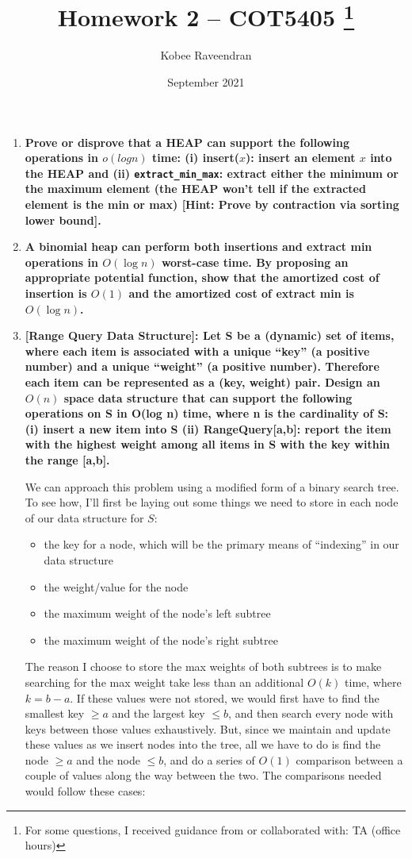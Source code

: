 \documentclass[12pt]{article}
\title{Homework 2 -- COT5405
    \thanks{For some questions, I received guidance from or collaborated with: TA (office hours)}
}
\author{Kobee Raveendran}
\date{September 2021}
\begin{document}
\maketitle

\begin{enumerate}
    \item \textbf{Prove or disprove that a HEAP can support the following operations in $o(log n)$ time: 
    (i) insert($x$): insert an element $x$ into the HEAP and (ii) \texttt{extract\_min\_max}: extract either 
    the minimum or the maximum element (the HEAP won't tell if the extracted element is the min 
    or max) [Hint: Prove by contraction via sorting lower bound].}
    \item \textbf{A binomial heap can perform both insertions and extract min operations in $O(\log n)$ 
    worst-case time. By proposing an appropriate potential function, show that the amortized 
    cost of insertion is $O(1)$ and the amortized cost of extract min is $O(\log n)$.}
    \item \textbf{[Range Query Data Structure]: Let S be a (dynamic) set of items, where each item is 
    associated with a unique ``key'' (a positive number) and a unique ``weight'' (a positive 
    number). Therefore each item can be represented as a (key, weight) pair. Design an $O(n)$ 
    space data structure that can support the following operations on S in O(log n) time, where 
    n is the cardinality of S: (i) insert a new item into S (ii) RangeQuery[a,b]: report the 
    item with the highest weight among all items in S with the key within the range [a,b].}

    We can approach this problem using a modified form of a binary search tree. To see how, I'll first be laying out 
    some things we need to store in each node of our data structure for $S$:

    \begin{itemize}
        \item the key for a node, which will be the primary means of ``indexing'' in our data structure
        \item the weight/value for the node
        \item the maximum weight of the node's left subtree
        \item the maximum weight of the node's right subtree
    \end{itemize}

    The reason I choose to store the max weights of both subtrees is to make searching for the max weight 
    take less than an additional $O(k)$ time, where $k = b - a$. If these values were not stored, we would first 
    have to find the smallest key $\geq a$ and the largest key $\leq b$, and then search every node with keys 
    between those values exhaustively. But, since we maintain and update these values as we insert nodes into the 
    tree, all we have to do is find the node $\geq a$ and the node $\leq b$, and do a series of $O(1)$ comparison between 
    a couple of values along the way between the two. The comparisons needed would follow these cases:


\end{enumerate}
\end{document}
